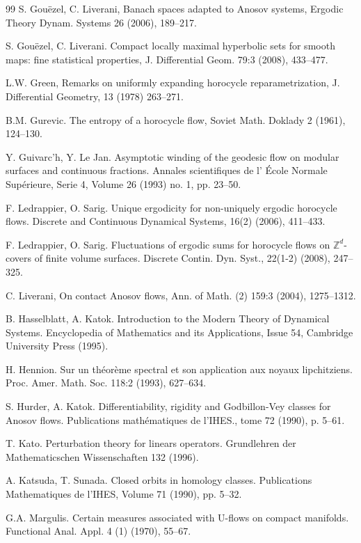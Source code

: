 \documentclass[11pt,letterpaper]{amsart}
\newcommand \Z {{ \mathbb Z}}
\theoremstyle{definition}
\begin{document}
\begin{thebibliography}{99}
 S. Gou\"ezel, C. Liverani, Banach spaces adapted to Anosov systems, Ergodic Theory Dynam. Systems 26 (2006), 189--217.

 S. Gou\"ezel, C. Liverani. Compact locally maximal hyperbolic sets for smooth maps: fine statistical properties, J. Differential Geom. 79:3 (2008), 433--477. 

 L.W. Green, Remarks on uniformly expanding horocycle reparametrization, J. Differential Geometry, { 13} (1978) 263--271.

 B.M. Gurevic. The entropy of a horocycle flow, Soviet Math. Doklady 2 (1961), 124--130.%

 Y. Guivarc'h, Y. Le Jan. Asymptotic winding of the geodesic flow on modular surfaces and continuous fractions. Annales scientifiques de l' \'Ecole Normale Sup\'erieure, Serie 4, Volume 26 (1993) no. 1, pp. 23--50.

 F. Ledrappier, O. Sarig. Unique ergodicity for non-uniquely ergodic horocycle flows. Discrete and Continuous Dynamical Systems, 16(2) (2006), 411--433.

 F. Ledrappier, O. Sarig. Fluctuations of ergodic sums for horocycle flows
on $\Z^d$-covers of finite volume surfaces. Discrete Contin. Dyn. Syst., 22(1-2) (2008), 247--325.

 C. Liverani, On contact Anosov flows, Ann. of Math. (2) 159:3 (2004), 1275--1312. 

 B. Hasselblatt, A. Katok. Introduction to the Modern Theory of Dynamical Systems. Encyclopedia of Mathematics and its Applications, Issue 54, Cambridge University Press (1995).

 H. Hennion. Sur un th\'eor\`eme spectral et son application aux noyaux lipchitziens. Proc. Amer. Math. Soc. 118:2 (1993), 627--634. 

 S. Hurder, A. Katok. Differentiability, rigidity and Godbillon-Vey classes for Anosov flows. Publications math\'ematiques de l'IHES., tome 72 (1990), p. 5--61.

 T. Kato. Perturbation theory for linears operators. Grundlehren der Mathematicschen Wissenschaften 132 (1996).

 A. Katsuda, T. Sunada. Closed orbits in homology classes. Publications Mathematiques de l'IHES, Volume 71 (1990), pp. 5--32.

 G.A. Margulis. Certain measures associated with U-flows on compact manifolds. Functional Anal. Appl. 4 (1) (1970), 55--67.


\end{thebibliography}
\end{document}
